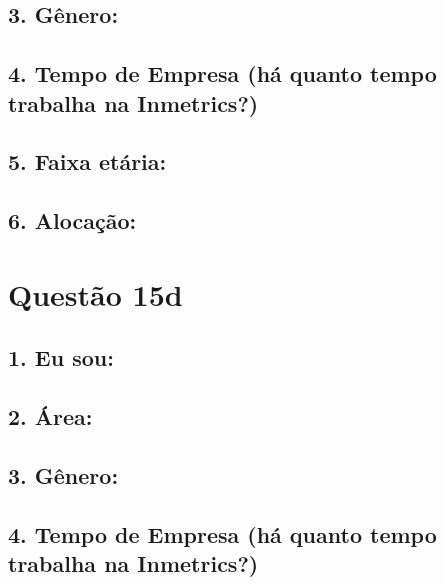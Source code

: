 \documentclass[]{book}
\begin{document}
\hypertarget{genero-25}{%
\subsection{3. Gênero:}\label{genero-25}}

\hypertarget{tempo-de-empresa-ha-quanto-tempo-trabalha-na-inmetrics-25}{%
\subsection{4. Tempo de Empresa (há quanto tempo trabalha na Inmetrics?)}\label{tempo-de-empresa-ha-quanto-tempo-trabalha-na-inmetrics-25}}

\hypertarget{faixa-etaria-25}{%
\subsection{5. Faixa etária:}\label{faixa-etaria-25}}

\hypertarget{alocacao-25}{%
\subsection{6. Alocação:}\label{alocacao-25}}

\hypertarget{questao-15d}{%
\section{Questão 15d}\label{questao-15d}}

\hypertarget{eu-sou-26}{%
\subsection{1. Eu sou:}\label{eu-sou-26}}

\hypertarget{area-26}{%
\subsection{2. Área:}\label{area-26}}

\hypertarget{genero-26}{%
\subsection{3. Gênero:}\label{genero-26}}

\hypertarget{tempo-de-empresa-ha-quanto-tempo-trabalha-na-inmetrics-26}{%
\subsection{4. Tempo de Empresa (há quanto tempo trabalha na Inmetrics?)}\label{tempo-de-empresa-ha-quanto-tempo-trabalha-na-inmetrics-26}}
\end{document}
